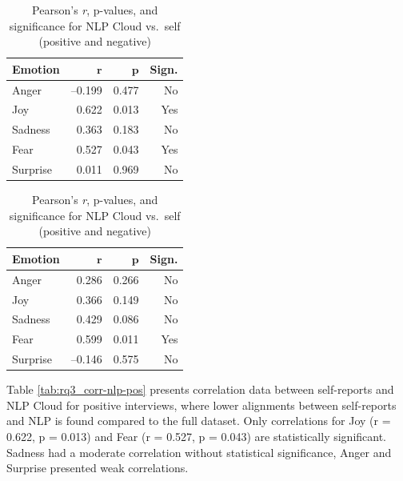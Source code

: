 \begin{table}[H]
    \centering
  
    \begin{subtable}{0.45\textwidth}
      \centering
      \caption{\textbf{Positive Recordings (NLP)}}\label{tab:rq3_corr-nlp-pos}
      \begin{tabular}{l r r r}
        \toprule
        \textbf{Emotion} & \(\mathbf{r}\) & \(\mathbf{p}\) & \textbf{Sign.} \\
        \midrule
        Anger    & –0.199 & 0.477 & No  \\
        Joy      &  0.622 & 0.013 & Yes \\
        Sadness  &  0.363 & 0.183 & No  \\
        Fear     &  0.527 & 0.043 & Yes \\
        Surprise &  0.011 & 0.969 & No  \\
        \bottomrule
      \end{tabular}
    \end{subtable}\hfill
    \begin{subtable}{0.45\textwidth}
      \centering
      \caption{\textbf{Negative Recordings (NLP)}}\label{tab:rq3_corr-nlp-neg}
      \begin{tabular}{l r r r}
        \toprule
        \textbf{Emotion} & \(\mathbf{r}\) & \(\mathbf{p}\) & \textbf{Sign.} \\
        \midrule
        Anger    &  0.286 & 0.266 & No  \\
        Joy      &  0.366 & 0.149 & No  \\
        Sadness  &  0.429 & 0.086 & No  \\
        Fear     &  0.599 & 0.011 & Yes \\
        Surprise & –0.146 & 0.575 & No  \\
        \bottomrule
      \end{tabular}
    \end{subtable}
  
    \caption{Pearson’s \emph{r}, p-values, and significance for NLP Cloud vs.\ self (positive and negative)}
    \label{tab:rq3_corr-nlp-pos-neg}
  \end{table}
  
  Table \ref{tab:rq3_corr-nlp-pos} presents correlation data between self-reports and NLP Cloud for positive interviews, where lower alignments between self-reports and NLP is found compared to the full dataset. 
  Only correlations for Joy (r = 0.622, p = 0.013) and Fear (r = 0.527, p = 0.043) are statistically significant. Sadness had a moderate correlation without statistical significance, Anger and Surprise presented weak correlations. 
  
